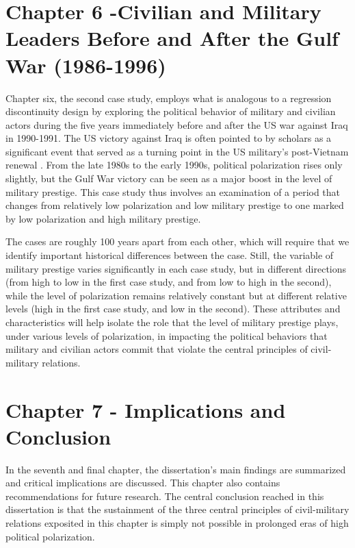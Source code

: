 \documentclass[
  12pt,
  oneside]{memoir}
\begin{document}
\hypertarget{chapter-6--civilian-and-military-leaders-before-and-after-the-gulf-war-1986-1996}{%
\section{Chapter 6 -Civilian and Military Leaders Before and After the Gulf War (1986-1996)}\label{chapter-6--civilian-and-military-leaders-before-and-after-the-gulf-war-1986-1996}}

Chapter six, the second case study, employs what is analogous to a regression discontinuity design by exploring the political behavior of military and civilian actors during the five years immediately before and after the US war against Iraq in 1990-1991. The US victory against Iraq is often pointed to by scholars as a significant event that served as a turning point in the US military's post-Vietnam renewal \autocite{kitfield_prodigal_1997}. From the late 1980s to the early 1990s, political polarization rises only slightly, but the Gulf War victory can be seen as a major boost in the level of military prestige. This case study thus involves an examination of a period that changes from relatively low polarization and low military prestige to one marked by low polarization and high military prestige.

The cases are roughly 100 years apart from each other, which will require that we identify important historical differences between the case. Still, the variable of military prestige varies significantly in each case study, but in different directions (from high to low in the first case study, and from low to high in the second), while the level of polarization remains relatively constant but at different relative levels (high in the first case study, and low in the second). These attributes and characteristics will help isolate the role that the level of military prestige plays, under various levels of polarization, in impacting the political behaviors that military and civilian actors commit that violate the central principles of civil-military relations.

\hypertarget{chapter-7---implications-and-conclusion}{%
\section{Chapter 7 - Implications and Conclusion}\label{chapter-7---implications-and-conclusion}}

In the seventh and final chapter, the dissertation's main findings are summarized and critical implications are discussed. This chapter also contains recommendations for future research. The central conclusion reached in this dissertation is that the sustainment of the three central principles of civil-military relations exposited in this chapter is simply not possible in prolonged eras of high political polarization.

\pagebreak

\printbibliography
\end{document}

